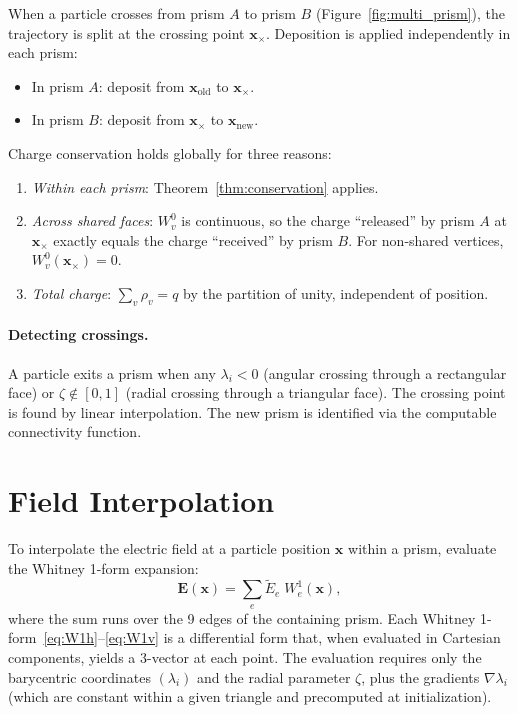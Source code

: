 \documentclass[11pt,a4paper]{article}
\begin{document}
When a particle crosses from prism $A$ to prism $B$
(Figure~\ref{fig:multi_prism}), the trajectory is split at the crossing point
$\bm{x}_\times$. Deposition is applied independently in each prism:
\begin{itemize}[nosep]
  \item In prism $A$: deposit from $\bm{x}_\text{old}$ to $\bm{x}_\times$.
  \item In prism $B$: deposit from $\bm{x}_\times$ to $\bm{x}_\text{new}$.
\end{itemize}

Charge conservation holds globally for three reasons:
\begin{enumerate}[nosep]
  \item \emph{Within each prism}: Theorem~\ref{thm:conservation} applies.
  \item \emph{Across shared faces}: $W^0_v$ is continuous, so the charge
    ``released'' by prism $A$ at $\bm{x}_\times$ exactly equals the charge
    ``received'' by prism $B$. For non-shared vertices,
    $W^0_v(\bm{x}_\times) = 0$.
  \item \emph{Total charge}: $\sum_v \rho_v = q$ by the partition of unity,
    independent of position.
\end{enumerate}

\paragraph{Detecting crossings.}
A particle exits a prism when any $\lambda_i < 0$ (angular crossing through a
rectangular face) or $\zeta \notin [0,1]$ (radial crossing through a
triangular face). The crossing point is found by linear interpolation. The new
prism is identified via the computable connectivity function.

\section{Field Interpolation}
\label{sec:interpolation}

To interpolate the electric field at a particle position $\bm{x}$ within a
prism, evaluate the Whitney 1-form expansion:
\begin{equation}
  \bm{E}(\bm{x}) = \sum_{e} \widetilde{E}_e\;W^1_e(\bm{x}),
\end{equation}
where the sum runs over the 9 edges of the containing prism. Each Whitney
1-form~\eqref{eq:W1h}--\eqref{eq:W1v} is a differential form that, when
evaluated in Cartesian components, yields a 3-vector at each point. The
evaluation requires only the barycentric coordinates $(\lambda_i)$ and the
radial parameter $\zeta$, plus the gradients $\nabla\lambda_i$ (which are
constant within a given triangle and precomputed at initialization).
\end{document}
